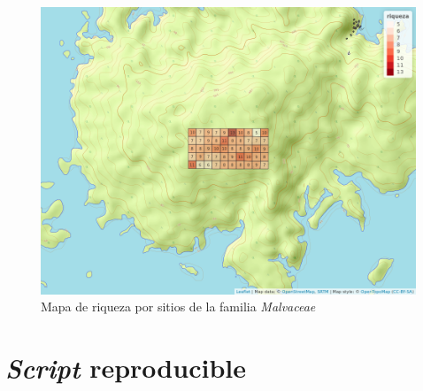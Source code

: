 \documentclass[11pt,]{article}
\begin{document}
\begin{figure}
\centering
\includegraphics{mapa_cuadros_riq_mi_familia.png}
\caption{\label{fig:soporte1} Mapa de riqueza por sitios de la familia
\emph{Malvaceae}}
\end{figure}

\section{\texorpdfstring{\emph{Script}
reproducible}{Script reproducible}}\label{script-reproducible}
\end{document}
